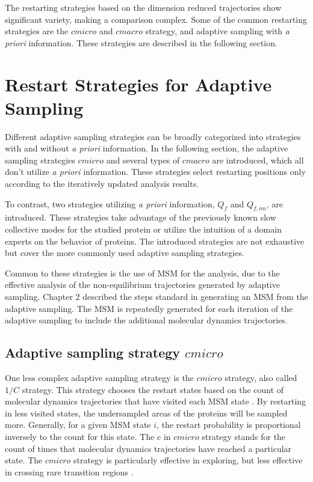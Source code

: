 The restarting strategies based on the dimension reduced trajectories show significant variety, making a comparison complex. Some of the common restarting strategies are the $cmicro$ and $cmacro$ strategy, and adaptive sampling with \emph{a priori} information. These strategies are described in the following section. 

\section{\label{sec:restart-strategies}Restart Strategies for Adaptive Sampling}


Different adaptive sampling strategies can be broadly categorized into strategies with and without \emph{a priori} information. In the following section, the adaptive sampling strategies $cmicro$ and several types of $cmacro$ are introduced, which all don't utilize \emph{a priori} information. These strategies select restarting positions only according to the iteratively updated analysis results. 

To contrast, two strategies utilizing \emph{a priori} information, $Q_{f}$ and $Q_{f,nn}$, are introduced. These strategies take advantage of the previously known slow collective modes for the studied protein or utilize the intuition of a domain experts on the behavior of proteins. The introduced strategies are not exhaustive but cover the more commonly used adaptive sampling strategies. 

Common to these strategies is the use of MSM for the analysis, due to the effective analysis of the non-equilibrium trajectories generated by adaptive sampling. Chapter 2 described the steps standard in generating an MSM from the adaptive sampling. The MSM is repeatedly generated for each iteration of the adaptive sampling to include the additional molecular dynamics trajectories. 

\subsection{Adaptive sampling strategy $cmicro$}
One less complex adaptive sampling strategy is the $cmicro$ strategy, also called $1/C$ strategy. This strategy chooses the restart
states based on the count of molecular dynamics trajectories that have visited each MSM state \cite{weber2011characterization, Fabritiis-2014, AdaptivePELE-Lecina2017,doerr2016htmd}.
By restarting in less visited states, the undersampled areas of the proteins will be sampled more. Generally, for a given MSM state $i$, the restart probability is proportional inversely to the count for this state. The c in $cmicro$ strategy stands for the count of times that molecular dynamics trajectories have reached a particular state. The $cmicro$ strategy is particularly effective in exploring, but less effective in crossing rare transition regions \cite{Adstrategies2018}.


